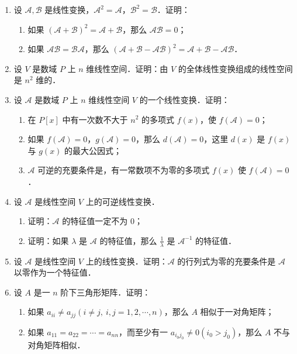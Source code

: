 \begin{enumerate}
  \item 设 $\mathcal{A},\mathcal{B}$ 是线性变换，$\mathcal{A}^2=\mathcal{A}$，$\mathcal{B}^2=\mathcal{B}$．证明：
  \begin{enumerate}
    \item 如果 $(\mathcal{A}+\mathcal{B})^2=\mathcal{A}+\mathcal{B}$，那么 $\mathcal{A}\mathcal{B}=0$；
  \anssub
    \item 如果 $\mathcal{A}\mathcal{B}=\mathcal{B}\mathcal{A}$，那么 $(\mathcal{A}+\mathcal{B}-\mathcal{A}\mathcal{B})^2=\mathcal{A}+\mathcal{B}-\mathcal{A}\mathcal{B}$．
  \anssub
  \end{enumerate}
  \item 设 $V$ 是数域 $P$ 上 $n$ 维线性空间．证明：由 $V$ 的全体线性变换组成的线性空间是 $n^2$ 维的．
  \ansproof
  \item 设 $\mathcal{A}$ 是数域 $P$ 上 $n$ 维线性空间 $V$ 的一个线性变换．证明：
  \begin{enumerate}
    \item 在 $P[x]$ 中有一次数不大于 $n^2$ 的多项式 $f(x)$，使 $f(\mathcal{A})=0$；
  \anssub
    \item 如果 $f(\mathcal{A})=0$，$g(\mathcal{A})=0$，那么 $d(\mathcal{A})=0$，这里 $d(x)$ 是 $f(x)$ 与 $g(x)$ 的最大公因式；
  \anssub
    \item $\mathcal{A}$ 可逆的充要条件是，有一常数项不为零的多项式 $f(x)$ 使 $f(\mathcal{A})=0$．
  \anssub
  \end{enumerate}
  \item 设 $\mathcal{A}$ 是线性空间 $V$ 上的可逆线性变换．
  \begin{enumerate}
    \item 证明：$\mathcal{A}$ 的特征值一定不为 0；
  \anssub
    \item 证明：如果 $\lambda$ 是 $\mathcal{A}$ 的特征值，那么 $\frac{1}{\lambda}$ 是 $\mathcal{A}^{-1}$ 的特征值．
  \anssub
  \end{enumerate}
  \item 设 $\mathcal{A}$ 是线性空间 $V$ 上的线性变换．证明：$\mathcal{A}$ 的行列式为零的充要条件是 $\mathcal{A}$ 以零作为一个特征值．
  \ansproof
  \item 设 $A$ 是一 $n$ 阶下三角形矩阵．证明：
  \begin{enumerate}
    \item 如果 $a_{ii}\ne a_{jj}(i\ne j,\ i,j=1,2,\cdots,n)$，那么 $A$ 相似于一对角矩阵；
  \anssub
    \item 如果 $a_{11}=a_{22}=\cdots=a_{nn}$，而至少有一 $a_{i_0j_0}\ne 0(i_0>j_0)$，那么 $A$ 不与对角矩阵相似．

\end{enumerate}
\end{enumerate}
